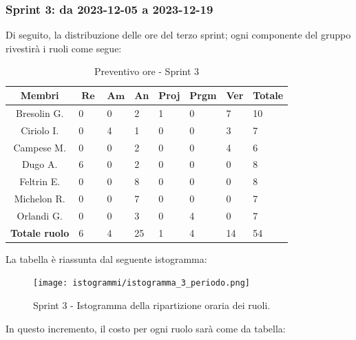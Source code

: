 \documentclass[10pt, a4paper]{article}
\begin{document}
{{{{{{{{{{\subsubsection{Sprint 3: da 2023-12-05 a 2023-12-19}
Di seguito, la distribuzione delle ore del terzo sprint; ogni componente del gruppo rivestirà i ruoli come segue:
\begin{table}[H]
\begin{tabularx}{\textwidth}{c|X|X|X|X|X|X|X}
        \textbf{Membri} & $\operatorname{\textbf{Re}}$ & $\mathrm{\textbf{Am}}$ & \textbf{An} & \textbf{Proj} & \textbf{Prgm} & \textbf{Ver} & \textbf{Totale} \\
        \hline Bresolin G. & 0 & 0 & 2 & 1 & 0 & \cellcolor{primarycolor}7 & 10 \\
        \hline Ciriolo I.  & 0 & \cellcolor{primarycolor}4 & 1 & 0 & 0 & 3 & 7 \\
        \hline Campese M.  & 0 & 0 & \cellcolor{primarycolor}2 & 0 & 0 & 4 & 6 \\
        \hline Dugo A.     & \cellcolor{primarycolor}6 & 0 & 2 & 0 & 0 & 0 & 8 \\
        \hline Feltrin E.  & 0 & 0 & \cellcolor{primarycolor}8 & 0 & 0 & 0 & 8 \\
        \hline Michelon R. & 0 & 0 & \cellcolor{primarycolor}7 & 0 & 0 & 0 & 7 \\
        \hline Orlandi G.  & 0 & 0 & 3 & 0 & \cellcolor{primarycolor}4 & 0 & 7 \\
        \hline
        \textbf{Totale ruolo} & 6 & 4 & 25 & 1 & 4 & 14 & 54 
    \end{tabularx}
    \caption{Preventivo ore - Sprint 3}
    \end{table}

La tabella è riassunta dal seguente istogramma:
 \begin{figure}[H]
        \centering        
        \texttt{[image: istogrammi/istogramma\_3\_periodo.png]}
        \caption{Sprint 3 - Istogramma della ripartizione oraria dei ruoli. }
    \end{figure}

In questo incremento, il costo per ogni ruolo sarà come da tabella:
{\renewcommand{\arraystretch}{1.5}
\begin{table}[H]
\centering
\begin{tabularx}{0.42\textwidth}{c|c|c}


\end{tabularx}
\end{table}}}}}}}}}}}}
\end{document}
